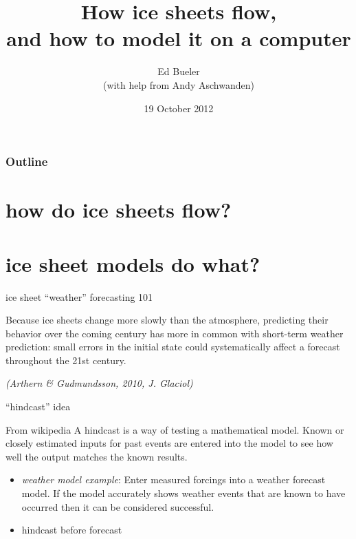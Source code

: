 \documentclass[hide notes,intlimits]{beamer}
\title[ice sheet modelling]{How ice sheets flow, \\ and how to model it on a computer}
\author[Bueler]{Ed Bueler \\ \medskip \scriptsize (with help from Andy Aschwanden)}
\institute{
  Dept.~of Mathematics and Statistics \\
  and Geophysical Institute\\
  UAF
}
\date{19 October 2012}
\begin{document}


  {
} 


\begin{frame}
  \titlepage
\end{frame}

{
%
} 

\begin{frame}
   \frametitle{Outline}
   \tableofcontents[subsectionstyle=hide/hide/hide]
\end{frame}
  
\section{how do ice sheets flow?}


\section{ice sheet models do what?}

\begin{frame}{ice sheet ``weather'' forecasting 101}

Because ice sheets change more slowly than the atmosphere, predicting their
behavior over the coming century has more in common with short-term
weather prediction: small errors in the initial state could
systematically affect a forecast throughout the 21st century.

\medskip
\emph{(Arthern \& Gudmundsson, 2010, J. Glaciol)}
\end{frame}


\begin{frame}{``hindcast'' idea}
  \begin{block}{From wikipedia} A hindcast is a way of testing a
mathematical model. Known or closely estimated inputs for past events
are entered into the model to see how well the output matches the
known results.
  \end{block}
 
\begin{itemize}
\item \emph{weather model example}:  Enter measured forcings into a weather forecast model.  If the model accurately shows
weather events that are known to have occurred then it can be
considered successful.
\item hindcast before forecast
\end{itemize}
\end{frame}
\end{document}
